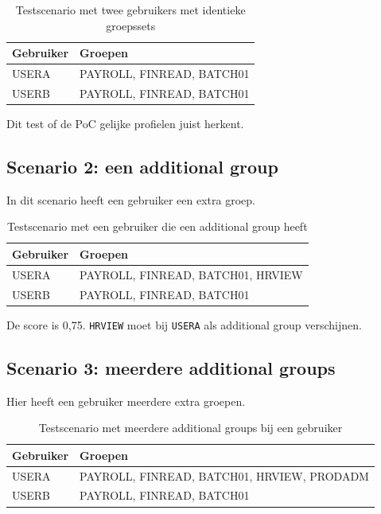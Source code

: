 \begin{table}[htbp]
\centering
\caption[Scenario 1: identieke gebruikers]{Testscenario met twee gebruikers met identieke groepssets}
\label{tab:scenario-identieke-gebruikers}
\begin{tabular}{|p{3cm}|p{8cm}|}
\hline
\textbf{Gebruiker} & \textbf{Groepen} \\
\hline
USERA & PAYROLL, FINREAD, BATCH01 \\
\hline
USERB & PAYROLL, FINREAD, BATCH01 \\
\hline
\end{tabular}
\end{table}

Dit test of de PoC gelijke profielen juist herkent.

\subsection*{Scenario 2: een additional group}

In dit scenario heeft een gebruiker een extra groep.

\begin{table}[htbp]
\centering
\caption[Scenario 2: een additional group]{Testscenario met een gebruiker die een additional group heeft}
\label{tab:scenario-een-additional-group}
\begin{tabular}{|p{3cm}|p{8cm}|}
\hline
\textbf{Gebruiker} & \textbf{Groepen} \\
\hline
USERA & PAYROLL, FINREAD, BATCH01, HRVIEW \\
\hline
USERB & PAYROLL, FINREAD, BATCH01 \\
\hline
\end{tabular}
\end{table}

De score is 0,75. \texttt{HRVIEW} moet bij \texttt{USERA} als additional group verschijnen.

\subsection*{Scenario 3: meerdere additional groups}

Hier heeft een gebruiker meerdere extra groepen.

\begin{table}[htbp]
\centering
\caption[Scenario 3: meerdere additional groups]{Testscenario met meerdere additional groups bij een gebruiker}
\label{tab:scenario-meerdere-additional-groups}
\begin{tabular}{|p{3cm}|p{8cm}|}
\hline
\textbf{Gebruiker} & \textbf{Groepen} \\
\hline
USERA & PAYROLL, FINREAD, BATCH01, HRVIEW, PRODADM \\
\hline
USERB & PAYROLL, FINREAD, BATCH01 \\
\hline
\end{tabular}
\end{table}

